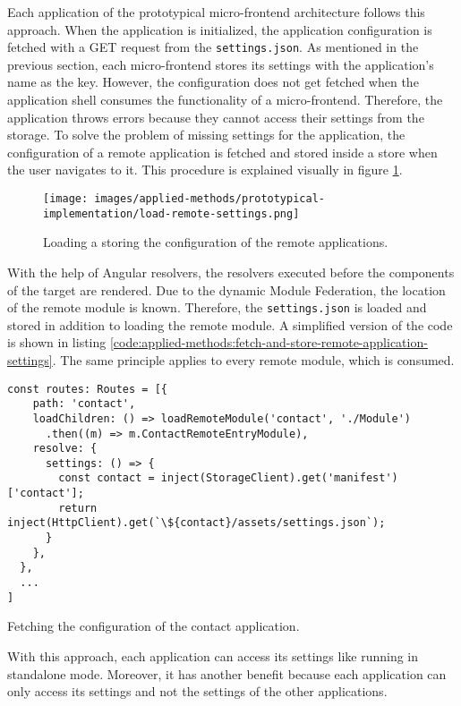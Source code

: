 Each application of the prototypical micro-frontend architecture follows this approach. When the application is initialized, the application configuration is fetched with a GET request from the \texttt{settings.json}. As mentioned in the previous section, each micro-frontend stores its settings with the application's name as the key. However, the configuration does not get fetched when the application shell consumes the functionality of a micro-frontend. Therefore, the application throws errors because they cannot access their settings from the storage. To solve the problem of missing settings for the application, the configuration of a remote application is fetched and stored inside a store when the user navigates to it. This procedure is explained visually in figure \ref{fig:applied-methods:load-remote-settings}.

\ifshowImages
  \begin{figure}[H]
  \centering
  \texttt{[image: images/applied-methods/prototypical-implementation/load-remote-settings.png]}
  \caption{Loading a storing the configuration of the remote applications.}\label{fig:applied-methods:load-remote-settings}
  \end{figure}
\fi

\noindent With the help of Angular resolvers, the resolvers executed before the components of the target are rendered. Due to the dynamic Module Federation, the location of the remote module is known. Therefore, the \texttt{settings.json} is loaded and stored in addition to loading the remote module. A simplified version of the code is shown in listing \ref{code:applied-methods:fetch-and-store-remote-application-settings}. The same principle applies to every remote module, which is consumed.

\ifshowListings
\begin{listing}[H]
\begin{verbatim}
const routes: Routes = [{
    path: 'contact',
    loadChildren: () => loadRemoteModule('contact', './Module')
      .then((m) => m.ContactRemoteEntryModule),
    resolve: {
      settings: () => {
        const contact = inject(StorageClient).get('manifest')['contact'];
        return inject(HttpClient).get(`\${contact}/assets/settings.json`);
      }
    },
  },
  ...
]
\end{verbatim}
\caption{Fetching the configuration of the contact application.}\label{code:applied-methods:fetch-and-store-remote-application-settings}
\end{listing}
\fi

\noindent With this approach, each application can access its settings like running in standalone mode. Moreover, it has another benefit because each application can only access its settings and not the settings of the other applications. 
